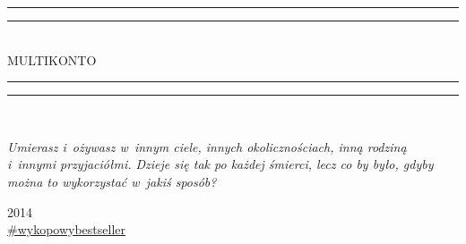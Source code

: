 \begin{titlepage}

	\textheight
	\centering
	\vspace*{\baselineskip}
	\rule{\textwidth}{1.6pt}\vspace*{-\baselineskip}\vspace*{2pt}
	\rule{\textwidth}{0.4pt}\\[\baselineskip]
	{\Huge MULTIKONTO}\\[0.2\baselineskip]
	\rule{\textwidth}{0.4pt}\vspace*{-\baselineskip}\vspace{3.2pt}
	\rule{\textwidth}{1.6pt}\\[\baselineskip]
	\vspace{18pt}
	{\itshape\small
	Umierasz i~ożywasz w~innym ciele, innych okolicznościach, inną rodziną i~innymi przyjaciółmi. Dzieje się tak po 
każdej śmierci, lecz co by było, gdyby można to wykorzystać w~jakiś sposób?\par}
	\vfill
	2014 \\
	{\large\href{http://www.wykop.pl/tag/wykopowybestseller}{\#wykopowybestseller}}\par

\end{titlepage}
